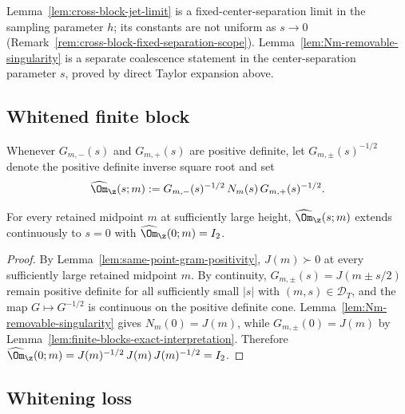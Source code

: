 \begin{remark}
\label{rem:Nm-coalescence-not-cross-limit}
Lemma~\ref{lem:cross-block-jet-limit} is a fixed-center-separation
limit in the sampling parameter \(h\); its constants are not uniform
as \(s\to 0\) (Remark~\ref{rem:cross-block-fixed-separation-scope}).
Lemma~\ref{lem:Nm-removable-singularity} is a separate coalescence
statement in the center-separation parameter \(s\), proved by direct
Taylor expansion above.
\end{remark}

\subsection{Whitened finite block}
\label{subsec:whitened-finite-block}

\begin{definition}
\label{def:whitened-finite-block}
Whenever \(G_{m,-}(s)\) and \(G_{m,+}(s)\) are positive definite, let
\(G_{m,\pm}(s)^{-1/2}\) denote the positive definite inverse square
root and set
\begin{equation}
\label{eq:omega-finite}
\widehat\Om_\z(s;m)
:= G_{m,-}(s)^{-1/2}\,N_m(s)\,G_{m,+}(s)^{-1/2}.
\end{equation}
\end{definition}

\begin{corollary}[Coalescence: \(\widehat\Om_\z(0;m) = I_2\)]
\label{cor:omega-coalescence}
For every retained midpoint \(m\) at sufficiently large height,
\(\widehat\Om_\z(s;m)\) extends continuously to \(s=0\) with
\(\widehat\Om_\z(0;m) = I_2\).
\end{corollary}

\begin{proof}
By Lemma~\ref{lem:same-point-gram-positivity}, \(J(m)\succ 0\) at
every sufficiently large retained midpoint \(m\).  By continuity,
\(G_{m,\pm}(s) = J(m\pm s/2)\) remain positive definite for all
sufficiently small \(|s|\) with \((m,s)\in\mathcal D_T\), and the map
\(G\mapsto G^{-1/2}\) is continuous on the positive definite cone.
Lemma~\ref{lem:Nm-removable-singularity} gives \(N_m(0) = J(m)\),
while \(G_{m,\pm}(0) = J(m)\) by
Lemma~\ref{lem:finite-blocks-exact-interpretation}.  Therefore
\(\widehat\Om_\z(0;m) = J(m)^{-1/2}\,J(m)\,J(m)^{-1/2} = I_2\).
\end{proof}

\subsection{Whitening loss}
\label{subsec:whitening-loss}

